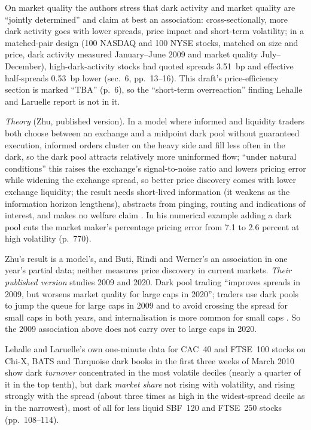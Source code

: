 \begin{qfdefinition}
On market quality the authors stress that dark activity and market quality are ``jointly determined'' and claim at best an association: cross-sectionally, more dark activity goes with lower spreads, price impact and short-term volatility; in a matched-pair design (100 NASDAQ and 100 NYSE stocks, matched on size and price, dark activity measured January--June 2009 and market quality July--December), high-dark-activity stocks had quoted spreads 3.51~bp and effective half-spreads 0.53~bp lower (sec.~6, pp.~13--16). This draft's price-efficiency section is marked ``TBA'' (p.~6), so the ``short-term overreaction'' finding Lehalle and Laruelle report is not in it.

\emph{Theory} (Zhu, published version). In a model where informed and liquidity traders both choose between an exchange and a midpoint dark pool without guaranteed execution, informed orders cluster on the heavy side and fill less often in the dark, so the dark pool attracts relatively more uninformed flow; ``under natural conditions'' this raises the exchange's signal-to-noise ratio and lowers pricing error while widening the exchange spread, so better price discovery comes with lower exchange liquidity; the result needs short-lived information (it weakens as the information horizon lengthens), abstracts from pinging, routing and indications of interest, and makes no welfare claim \citep[pp.~747--750, Propositions~3--4, pp.~763 and~770]{wide-zhu-dark-pools}. In his numerical example adding a dark pool cuts the market maker's percentage pricing error from 7.1 to 2.6 percent at high volatility (p.~770).

Zhu's result is a model's, and Buti, Rindi and Werner's an association in one year's partial data; neither measures price discovery in current markets. \emph{Their published version} studies 2009 and 2020. Dark pool trading ``improves spreads in 2009, but worsens market quality for large caps in 2020''; traders use dark pools to jump the queue for large caps in 2009 and to avoid crossing the spread for small caps in both years, and internalisation is more common for small caps \citep[abstract]{brw-2022-published}. So the 2009 association above does not carry over to large caps in 2020.

Lehalle and Laruelle's own one-minute data for CAC~40 and FTSE~100 stocks on Chi-X, BATS and Turquoise dark books in the first three weeks of March 2010 show dark \emph{turnover} concentrated in the most volatile deciles (nearly a quarter of it in the top tenth), but dark \emph{market share} not rising with volatility, and rising strongly with the spread (about three times as high in the widest-spread decile as in the narrowest), most of all for less liquid SBF~120 and FTSE~250 stocks (pp.~108--114).


\end{qfdefinition}
